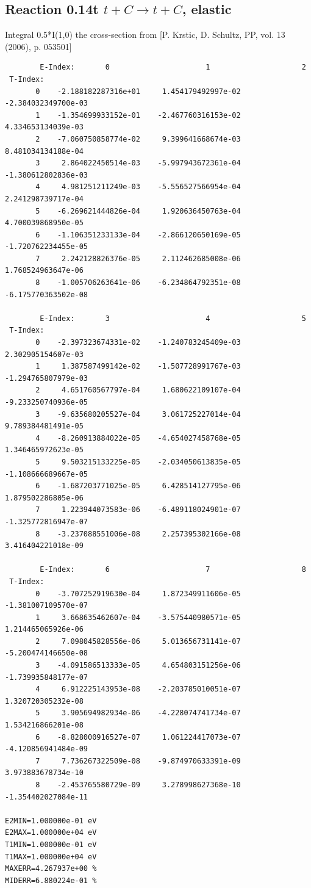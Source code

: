 \documentclass[12pt,dvipdfmx]{article}
\begin{document}
\subsection{
Reaction 0.14t  $t + C \rightarrow t + C$, elastic}

Integral 0.5*I(1,0) the cross-section from [P. Krstic, D. Schultz, PP, vol. 13 (2006), p. 053501]

\begin{small}\begin{verbatim}
        E-Index:       0                      1                     2
 T-Index:
       0    -2.188182287316e+01     1.454179492997e-02    -2.384032349700e-03
       1    -1.354699933152e-01    -2.467760316153e-02     4.334653134039e-03
       2    -7.060750858774e-02     9.399641668674e-03     8.481034134188e-04
       3     2.864022450514e-03    -5.997943672361e-04    -1.380612802836e-03
       4     4.981251211249e-03    -5.556527566954e-04     2.241298739717e-04
       5    -6.269621444826e-04     1.920636450763e-04     4.700039868950e-05
       6    -1.106351233133e-04    -2.866120650169e-05    -1.720762234455e-05
       7     2.242128826376e-05     2.112462685008e-06     1.768524963647e-06
       8    -1.005706263641e-06    -6.234864792351e-08    -6.175770363502e-08

        E-Index:       3                      4                     5
 T-Index:
       0    -2.397323674331e-02    -1.240783245409e-03     2.302905154607e-03
       1     1.387587499142e-02    -1.507728991767e-03    -1.294765807979e-03
       2     4.651760567797e-04     1.680622109107e-04    -9.233250740936e-05
       3    -9.635680205527e-04     3.061725227014e-04     9.789384481491e-05
       4    -8.260913884022e-05    -4.654027458768e-05     1.346465972623e-05
       5     9.503215133225e-05    -2.034050613835e-05    -1.108666689667e-05
       6    -1.687203771025e-05     6.428514127795e-06     1.879502286805e-06
       7     1.223944073583e-06    -6.489118024901e-07    -1.325772816947e-07
       8    -3.237088551006e-08     2.257395302166e-08     3.416404221018e-09

        E-Index:       6                      7                     8
 T-Index:
       0    -3.707252919630e-04     1.872349911606e-05    -1.381007109570e-07
       1     3.668635462607e-04    -3.575440980571e-05     1.214465065926e-06
       2     7.098045828556e-06     5.013656731141e-07    -5.200474146650e-08
       3    -4.091586513333e-05     4.654803151256e-06    -1.739935848177e-07
       4     6.912225143953e-08    -2.203785010051e-07     1.320720305232e-08
       5     3.905694982934e-06    -4.228074741734e-07     1.534216866201e-08
       6    -8.828000916527e-07     1.061224417073e-07    -4.120856941484e-09
       7     7.736267322509e-08    -9.874970633391e-09     3.973883678734e-10
       8    -2.453765580729e-09     3.278998627368e-10    -1.354402027084e-11

E2MIN=1.000000e-01 eV
E2MAX=1.000000e+04 eV
T1MIN=1.000000e-01 eV
T1MAX=1.000000e+04 eV
MAXERR=4.267937e+00 %
MIDERR=6.880224e-01 %
\end{verbatim}\end{small}
\newpage
\end{document}
